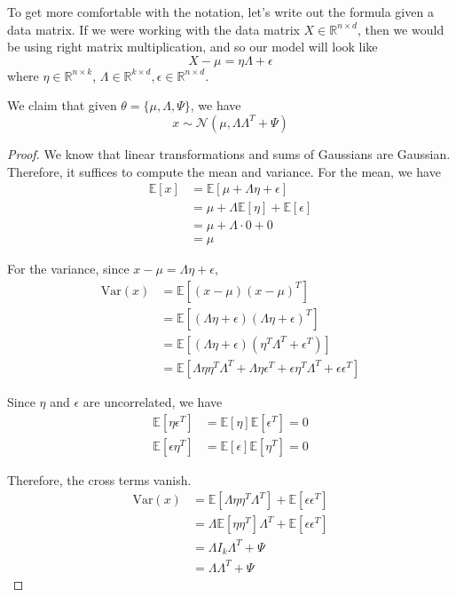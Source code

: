   To get more comfortable with the notation, let's write out the formula given a data matrix. If we were working with the data matrix $X \in \mathbb{R}^{n \times d}$, then we would be using right matrix multiplication, and so our model will look like 
  \begin{equation}
    X - \mu = \eta \Lambda + \epsilon
  \end{equation}
  where $\eta \in \mathbb{R}^{n \times k}$, $\Lambda \in \mathbb{R}^{k \times d}, \epsilon \in \mathbb{R}^{n \times d}$. 

  \begin{lemma}
    We claim that given $\theta = \{\mu, \Lambda, \Psi\}$, we have
    \begin{equation}
      x \sim \mathcal{N}(\mu, \Lambda \Lambda^T + \Psi)
    \end{equation}
  \end{lemma}
  \begin{proof}
    We know that linear transformations and sums of Gaussians are Gaussian. Therefore, it suffices to compute the mean and variance. For the mean, we have 
    \begin{align}
      \mathbb{E}[x] &= \mathbb{E}[\mu + \Lambda \eta + \epsilon] \\
      &= \mu + \Lambda \mathbb{E}[\eta] + \mathbb{E}[\epsilon] \\
      &= \mu + \Lambda \cdot 0 + 0 \\
      &= \mu
    \end{align}

    For the variance, since $x - \mu = \Lambda \eta +  \epsilon$, 
    \begin{align}
      \text{Var}(x) &= \mathbb{E}[(x - \mu)(x - \mu)^T] \\
      &= \mathbb{E}[(\Lambda \eta + \epsilon)(\Lambda \eta + \epsilon)^T] \\
      &= \mathbb{E}[(\Lambda \eta + \epsilon)(\eta^T \Lambda^T + \epsilon^T)] \\
      &= \mathbb{E}[\Lambda \eta \eta^T \Lambda^T + \Lambda \eta  \epsilon^T + \epsilon \eta^T \Lambda^T + \epsilon \epsilon^T ]
    \end{align}
    
    Since $\eta$ and $\epsilon$ are uncorrelated, we have 
    \begin{align}
      \mathbb{E}[\eta \epsilon^T] &= \mathbb{E}[\eta]\mathbb{E}[\epsilon^T] = 0 \\
      \mathbb{E}[\epsilon \eta^T] &= \mathbb{E}[\epsilon]\mathbb{E}[\eta^T] = 0
    \end{align}
    
    Therefore, the cross terms vanish. 
    \begin{align}
      \text{Var}(x) &= \mathbb{E}[\Lambda \eta \eta^T \Lambda^T] + \mathbb{E}[\epsilon \epsilon^T] \\
      &= \Lambda \mathbb{E}[\eta \eta^T] \Lambda^T + \mathbb{E}[\epsilon \epsilon^T] \\ 
      &= \Lambda I_k \Lambda^T + \Psi \\
      &= \Lambda \Lambda^T + \Psi
    \end{align}
  \end{proof}

